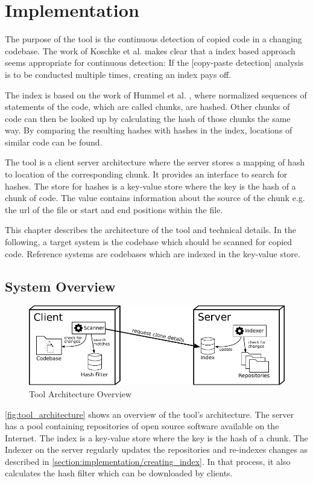 


\chapter{Implementation}\label{chapter:implementation}
The purpose of the tool is the continuous detection of copied code in a changing codebase.
The work of Koschke et al. makes clear that a index based approach seems appropriate for continuous detection:
\glqq If the [copy-paste detection] analysis is to be conducted multiple times, creating an index pays off\grqq \cite{koschke2014large}.

The index is based on the work of Hummel et al. \cite{hummel2010index}, where normalized sequences of statements of the code, which are called chunks, are hashed.
Other chunks of code can then be looked up by calculating the hash of those chunks the same way.
By comparing the resulting hashes with hashes in the index, locations of similar code can be found.

The tool is a client server architecture where the server stores a mapping of hash to location of the corresponding chunk.
It provides an interface to search for hashes.
The store for hashes is a key-value store where the key is the hash of a chunk of code.
The value contains information about the source of the chunk e.g. the url of the file or start and end positions within the file.

This chapter describes the architecture of the tool and technical details.
In the following, a target system is the codebase which should be scanned for copied code.
Reference systems are codebases which are indexed in the key-value store.

\section{System Overview}
\begin{figure}[h]
	\includegraphics{figures/architecture_overview.pdf}
	\caption{Tool Architecture Overview}\label{fig:tool_architecture}
\end{figure}
\autoref{fig:tool_architecture} shows an overview of the tool's architecture.
The server has a pool containing repositories of open source software available on the Internet.
The index is a key-value store where the key is the hash of a chunk.
The Indexer on the server regularly updates the repositories and re-indexes changes as described in \ref{section:implementation/creating_index}.
In that process, it also calculates the hash filter which can be downloaded by clients.


